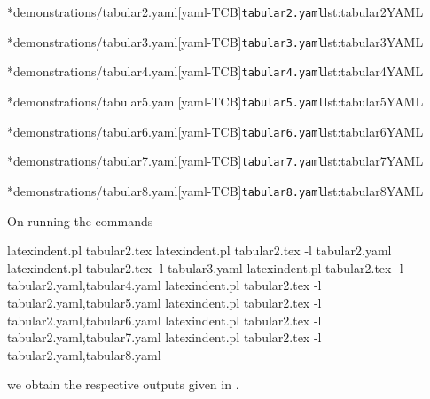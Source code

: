 	\begin{minipage}{.45\textwidth}
		\cmhlistingsfromfile[style=yaml-LST]*{demonstrations/tabular2.yaml}[yaml-TCB]{\texttt{tabular2.yaml}}{lst:tabular2YAML}
	\end{minipage}%
	\hfill
	\begin{minipage}{.48\textwidth}
		\cmhlistingsfromfile[style=yaml-LST]*{demonstrations/tabular3.yaml}[yaml-TCB]{\texttt{tabular3.yaml}}{lst:tabular3YAML}
	\end{minipage}%

	\begin{minipage}{.45\textwidth}
		\cmhlistingsfromfile[style=yaml-LST]*{demonstrations/tabular4.yaml}[yaml-TCB]{\texttt{tabular4.yaml}}{lst:tabular4YAML}
	\end{minipage}%
	\hfill
	\begin{minipage}{.48\textwidth}
		\cmhlistingsfromfile[style=yaml-LST]*{demonstrations/tabular5.yaml}[yaml-TCB]{\texttt{tabular5.yaml}}{lst:tabular5YAML}
	\end{minipage}%

	\begin{minipage}{.45\textwidth}
		\cmhlistingsfromfile[style=yaml-LST]*{demonstrations/tabular6.yaml}[yaml-TCB]{\texttt{tabular6.yaml}}{lst:tabular6YAML}
	\end{minipage}%
	\hfill
	\begin{minipage}{.48\textwidth}
		\cmhlistingsfromfile[style=yaml-LST]*{demonstrations/tabular7.yaml}[yaml-TCB]{\texttt{tabular7.yaml}}{lst:tabular7YAML}
	\end{minipage}%

	\begin{minipage}{.48\textwidth}
		\cmhlistingsfromfile[style=yaml-LST]*{demonstrations/tabular8.yaml}[yaml-TCB]{\texttt{tabular8.yaml}}{lst:tabular8YAML}
	\end{minipage}%

	On running the commands
	\begin{commandshell}
latexindent.pl tabular2.tex 
latexindent.pl tabular2.tex -l tabular2.yaml
latexindent.pl tabular2.tex -l tabular3.yaml
latexindent.pl tabular2.tex -l tabular2.yaml,tabular4.yaml
latexindent.pl tabular2.tex -l tabular2.yaml,tabular5.yaml
latexindent.pl tabular2.tex -l tabular2.yaml,tabular6.yaml
latexindent.pl tabular2.tex -l tabular2.yaml,tabular7.yaml
latexindent.pl tabular2.tex -l tabular2.yaml,tabular8.yaml
        \end{commandshell}
	we obtain the respective outputs given in .

